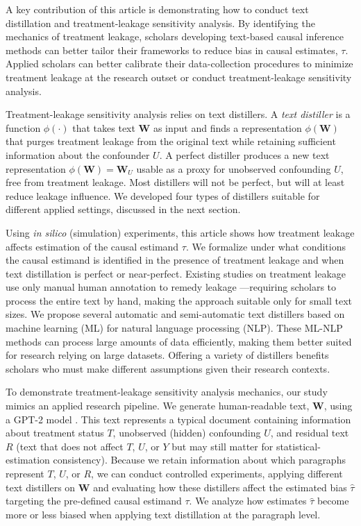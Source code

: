\documentclass[11pt]{article}
\newcommand{\bW}{\bm{W}}  %
\begin{document}
A key contribution of this article is demonstrating how to conduct text distillation and treatment-leakage sensitivity analysis. By identifying the mechanics of treatment leakage, scholars developing text-based causal inference methods can better tailor their frameworks to reduce bias in causal estimates, $\tau$. Applied scholars can better calibrate their data-collection procedures to minimize treatment leakage at the research outset or conduct treatment-leakage sensitivity analysis.

Treatment-leakage sensitivity analysis relies on text distillers. A \textit{text distiller} is a function $\phi(\cdot)$ that takes text $\bW$ as input and finds a representation $\phi(\bW)$ that purges treatment leakage from the original text while retaining sufficient information about the confounder $U$. A perfect distiller produces a new text representation $\phi(\bW)=\bW_U$ usable as a proxy for unobserved confounding $U$, free from treatment leakage. Most distillers will not be perfect, but will at least reduce leakage influence. We developed four types of distillers suitable for different applied settings, discussed in the next section.

Using \textit{in silico} (simulation) experiments, this article shows how treatment leakage affects estimation of the causal estimand $\tau$. We formalize under what conditions the causal estimand is identified in the presence of treatment leakage and when text distillation is perfect or near-perfect. Existing studies on treatment leakage use only manual human annotation to remedy leakage \citep{daoud2022conceptualizing}---requiring scholars to process the entire text by hand, making the approach suitable only for small text sizes. We propose several automatic and semi-automatic text distillers based on machine learning (ML) for natural language processing (NLP). These ML-NLP methods can process large amounts of data efficiently, making them better suited for research relying on large datasets. Offering a variety of distillers benefits scholars who must make different assumptions given their research contexts.

To demonstrate treatment-leakage sensitivity analysis mechanics, our study mimics an applied research pipeline. We generate human-readable text, $\bW$, using a GPT-2 model \citep{wooddoughty2021}. This text represents a typical document containing information about treatment status $T$, unobserved (hidden) confounding $U$, and residual text $R$ (text that does not affect $T$, $U$, or $Y$ but may still matter for statistical-estimation consistency). Because we retain information about which paragraphs represent $T$, $U$, or $R$, we can conduct controlled experiments, applying different text distillers on $\bW$ and evaluating how these distillers affect the estimated bias $\hat{\tau}$ targeting the pre-defined causal estimand $\tau$. We analyze how estimates $\hat{\tau}$ become more or less biased when applying text distillation at the paragraph level.
\end{document}
